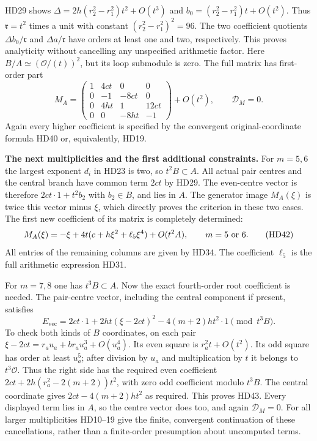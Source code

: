 \documentclass[11pt,a4paper]{article}
\theoremstyle{definition}\newtheorem{definition}[theorem]{Definition}
\begin{document}
HD29 shows $\Delta=2h(r_2^2-r_1^2)t^2+O(t^3)$ and
$b_0=(r_2^2-r_1^2)t+O(t^2)$.
Thus $\mathfrak r=t^2$ times a unit with constant
$(r_2^2-r_1^2)^2=96$. The two coefficient quotients
$\Delta b_0/\mathfrak r$ and $\Delta a/\mathfrak r$ have orders
at least one and two, respectively. This proves analyticity
without cancelling any unspecified arithmetic factor.
Here $B/A\simeq(\mathcal O/(t))^2$, but its loop submodule is zero.
The full matrix has first-order part
\[
 M_A=
 \begin{pmatrix}
 1&4ct&0&0\\
 0&-1&-8ct&0\\
 0&4ht&1&12ct\\
 0&0&-8ht&-1
 \end{pmatrix}
       +O(t^2),\qquad \mathcal D_M=0 .
 \tag{HD41}
\]
Again every higher coefficient is specified by the convergent
original-coordinate formula HD40 or, equivalently, HD19.

\HD\textbf{The next multiplicities and the first additional constraints.}
For $m=5,6$ the largest exponent $d_i$ in HD23 is two, so
$t^2B\subset A$. All actual pair centres and the central branch
have common term $2ct$ by HD29. The even-centre vector is therefore
$2ct\cdot1+t^2b_2$ with $b_2\in B$, and lies in $A$.
The generator image $M_A(\xi)$ is twice this vector minus $\xi$,
which directly proves the criterion in these two cases.
The first new coefficient of its matrix is completely determined:
\[
 M_A(\xi)=-\xi+4t(c+h\xi^2+\ell_5\xi^4)+O(t^2A),
       \qquad m=5\ \hbox{or}\ 6 .
 \tag{HD42}
\]
All entries of the remaining columns are given by HD34.
The coefficient $\ell_5$ is the full arithmetic expression HD31.

For $m=7,8$ one has $t^3B\subset A$. Now the exact fourth-order
root coefficient is needed. The pair-centre vector, including
the central component if present, satisfies
\[
 E_{\mathrm{vec}}=
  2ct\cdot1+
  2ht(\xi-2ct)^2-4(m+2)ht^2\cdot1\pmod{t^3B}.
 \tag{HD43}
\]
To check both kinds of $B$ coordinates, on each pair
$\xi-2ct=r_au_a+b r_au_a^3+O(u_a^4)$.
Its even square is $r_a^2t+O(t^2)$.
Its odd square has order at least $u_a^5$; after division by
$u_a$ and multiplication by $t$ it belongs to $t^3\mathcal O$.
Thus the right side has the required even coefficient
$2ct+2h(r_a^2-2(m+2))t^2$, with zero odd coefficient modulo
$t^3B$. The central coordinate gives
$2ct-4(m+2)ht^2$ as required. This proves HD43.
Every displayed term lies in $A$, so the centre vector does too,
and again $\mathcal D_M=0$.
For all larger multiplicities HD10--19 give the finite, convergent
continuation of these cancellations, rather than a finite-order
presumption about uncomputed terms.
\end{document}

